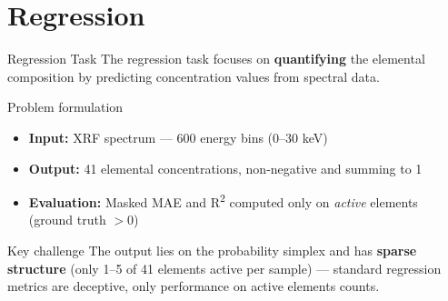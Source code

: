 \section{Regression}

\begin{frame}{Regression Task}
    The regression task focuses on \textbf{quantifying} the elemental composition by predicting concentration values from spectral data.

    \vspace{0.3cm}
    \begin{block}{Problem formulation}
        \begin{itemize}
            \item \textbf{Input:} XRF spectrum — 600 energy bins (0–30 keV)
            \item \textbf{Output:} 41 elemental concentrations, non-negative and summing to 1
            \item \textbf{Evaluation:} Masked MAE and R\textsuperscript{2} computed only on \textit{active} elements (ground truth $> 0$)
        \end{itemize}
    \end{block}

    \vspace{0.3cm}
    \begin{block}{Key challenge}
        The output lies on the probability simplex and has \textbf{sparse structure} (only 1–5 of 41 elements active per sample) — standard regression metrics are deceptive, only performance on active elements counts.
    \end{block}
\end{frame}

